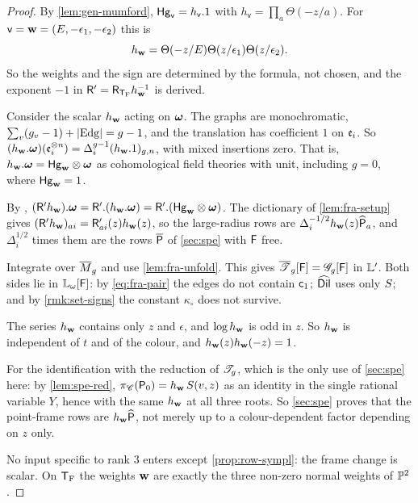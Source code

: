 \begin{proof}
By \cref{lem:gen-mumford}, $\mathsf{Hg}_{\mathsf{v}}=h_{\mathsf{v}}.1$ with $h_{\mathsf{v}}=\prod_a\Theta(-z/a)$. For $\mathsf{v}=\mathbf{w}=(E,-\epsilon_1,-\epsilon_2)$ this is
\[
h_{\mathbf{w}}=\Theta(-z/E)\Theta(z/\epsilon_1)\Theta(z/\epsilon_2).
\]
So the weights and the sign are determined by the formula, not chosen, and the exponent $-1$ in $\mathsf{R}'=\mathsf{R}_{\mathsf{T}_{\mathrm{F}}}h_{\mathbf{w}}^{-1}$ is derived.

Consider the scalar $h_{\mathbf{w}}$ acting on $\boldsymbol{\omega}$. The graphs are monochromatic, $\sum_v(g_v-1)+|\mathrm{Edg}|=g-1$, and the translation has coefficient $1$ on $\mathfrak{e}_i$. So $(h_{\mathbf{w}}.\boldsymbol{\omega})(\mathfrak{e}_i^{\otimes n})=\Delta_i^{g-1}(h_{\mathbf{w}}.1)_{g,n}$, with mixed insertions zero. That is, $h_{\mathbf{w}}.\boldsymbol{\omega}=\mathsf{Hg}_{\mathbf{w}}\otimes\boldsymbol{\omega}$ as cohomological field theories with unit, including $g=0$, where $\mathsf{Hg}_{\mathbf{w}}=1$.

By \cite[Proposition~2.14]{PPZ15}, $(\mathsf{R}'h_{\mathbf{w}}).\boldsymbol{\omega}=\mathsf{R}'.(h_{\mathbf{w}}.\boldsymbol{\omega})=\mathsf{R}'.(\mathsf{Hg}_{\mathbf{w}}\otimes\boldsymbol{\omega})$. The dictionary of \cref{lem:fra-setup} gives $(\mathsf{R}'h_{\mathbf{w}})_{ai}=\mathsf{R}'_{ai}(z)h_{\mathbf{w}}(z)$, so the large-radius rows are $\Delta_i^{-1/2}h_{\mathbf{w}}(z)\widehat{\mathsf{P}}_a$, and $\Delta_i^{1/2}$ times them are the rows $\overline{\mathsf{P}}$ of \cref{sec:spe} with $\mathsf{F}$ free.

Integrate over $\overline{M}_g$ and use \cref{lem:fra-unfold}. This gives $\overline{\mathscr{T}}_g[\mathsf{F}]=\mathscr{G}_g[\mathsf{F}]$ in $\mathbb{L}'$. Both sides lie in $\mathbb{L}_{\omega}[\mathsf{F}]$: by \eqref{eq:fra-pair} the edges do not contain $\mathsf{c}_{1}$; $\widehat{\mathsf{Dil}}$ uses only $S$; and by \cref{rmk:set-signs} the constant $\kappa_{\circ}$ does not survive.

The series $h_{\mathbf{w}}$ contains only $z$ and $\epsilon$, and $\log h_{\mathbf{w}}$ is odd in $z$. So $h_{\mathbf{w}}$ is independent of $t$ and of the colour, and $h_{\mathbf{w}}(z)h_{\mathbf{w}}(-z)=1$.

For the identification with the reduction of $\mathscr{T}_g$, which is the only use of \cref{sec:spe} here: by \cref{lem:spe-red}, $\pi_{\mathscr{C}}(\mathsf{P}_0)=h_{\mathbf{w}}\,S(v,z)$ as an identity in the single rational variable $Y$, hence with the same $h_{\mathbf{w}}$ at all three roots. So \cref{sec:spe} proves that the point-frame rows are $h_{\mathbf{w}}\widehat{\mathsf{P}}$, not merely up to a colour-dependent factor depending on $z$ only.

No input specific to rank $3$ enters except \cref{prop:row-sympl}: the frame change is scalar. On $\mathsf{T}_{\mathrm{F}}$ the weights $\mathbf{w}$ are exactly the three non-zero normal weights of $\mathbb{P}^2$.
\end{proof}

